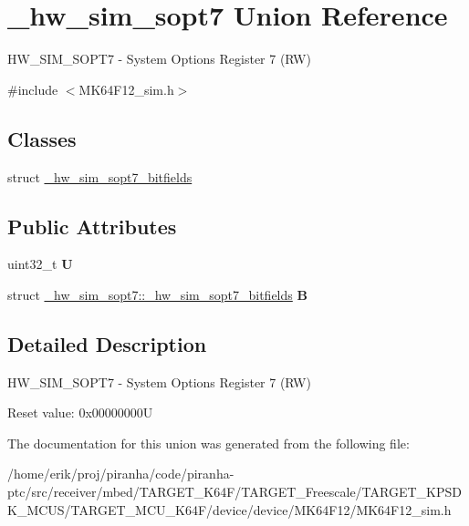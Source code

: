 \hypertarget{union__hw__sim__sopt7}{}\section{\+\_\+hw\+\_\+sim\+\_\+sopt7 Union Reference}
\label{union__hw__sim__sopt7}


H\+W\+\_\+\+S\+I\+M\+\_\+\+S\+O\+P\+T7 -\/ System Options Register 7 (RW)  




{\ttfamily \#include $<$M\+K64\+F12\+\_\+sim.\+h$>$}

\subsection*{Classes}
\begin{DoxyCompactItemize}
\item 
struct \hyperlink{struct__hw__sim__sopt7_1_1__hw__sim__sopt7__bitfields}{\+\_\+hw\+\_\+sim\+\_\+sopt7\+\_\+bitfields}
\end{DoxyCompactItemize}
\subsection*{Public Attributes}
\begin{DoxyCompactItemize}
\item 
uint32\+\_\+t {\bfseries U}\hypertarget{union__hw__sim__sopt7_a3aa304e9288c30c738258d32834eb14a}{}\label{union__hw__sim__sopt7_a3aa304e9288c30c738258d32834eb14a}

\item 
struct \hyperlink{struct__hw__sim__sopt7_1_1__hw__sim__sopt7__bitfields}{\+\_\+hw\+\_\+sim\+\_\+sopt7\+::\+\_\+hw\+\_\+sim\+\_\+sopt7\+\_\+bitfields} {\bfseries B}\hypertarget{union__hw__sim__sopt7_a1feae46e18d5d2c0b7b5dd14f902040c}{}\label{union__hw__sim__sopt7_a1feae46e18d5d2c0b7b5dd14f902040c}

\end{DoxyCompactItemize}


\subsection{Detailed Description}
H\+W\+\_\+\+S\+I\+M\+\_\+\+S\+O\+P\+T7 -\/ System Options Register 7 (RW) 

Reset value\+: 0x00000000U 

The documentation for this union was generated from the following file\+:\begin{DoxyCompactItemize}
\item 
/home/erik/proj/piranha/code/piranha-\/ptc/src/receiver/mbed/\+T\+A\+R\+G\+E\+T\+\_\+\+K64\+F/\+T\+A\+R\+G\+E\+T\+\_\+\+Freescale/\+T\+A\+R\+G\+E\+T\+\_\+\+K\+P\+S\+D\+K\+\_\+\+M\+C\+U\+S/\+T\+A\+R\+G\+E\+T\+\_\+\+M\+C\+U\+\_\+\+K64\+F/device/device/\+M\+K64\+F12/M\+K64\+F12\+\_\+sim.\+h\end{DoxyCompactItemize}
